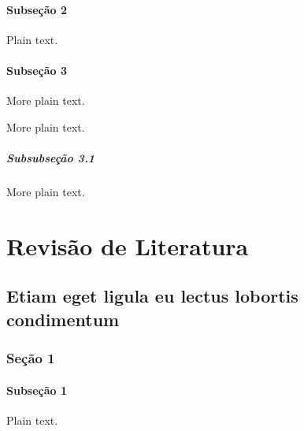 \documentclass[12pt,openright,twoside,a4paper]{abntex2}
\begin{document}
\lipsum[8-10]

\subsection{Subseção 2}

Plain text.

\lipsum[11-15]

\subsection{Subseção 3}

More plain text.

\lipsum[16-20]

More plain text.

\subsubsection{Subsubseção 3.1}

More plain text.

\lipsum[21-25]


\part{Revisão de Literatura}


\chapter{Etiam eget ligula eu lectus lobortis condimentum}

\lipsum[1-3]

\section{Seção 1}

\lipsum[4-5]

\subsection{Subseção 1}

Plain text.
\end{document}
